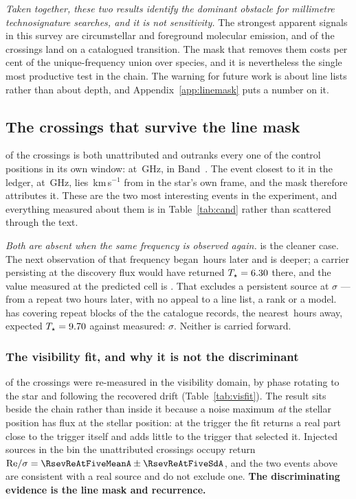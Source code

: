 \emph{Taken together, these two results identify the dominant obstacle for
millimetre technosignature searches, and it is not sensitivity.} The
strongest apparent signals in this survey are circumstellar and foreground
molecular emission, and \NAttributed{} of the \NCross{} crossings land on a
catalogued transition. The mask that removes them costs \FrMaskPct{} per
cent of the unique-frequency union over \FrNSpec{} species, and it is
nevertheless the single most productive test in the chain. The warning for
future work is about line lists rather than about depth, and
Appendix~\ref{app:linemask} puts a number on it.

\subsection{The crossings that survive the line mask}
\label{sec:chaingap}

\NUnattrRankFlagged{} of the \NCross{} crossings is both unattributed and
outranks every one of the \NCtrl{} control positions in its own window:
\RcSxStar{} at \RcSxFreq\,GHz, in Band~\RcSxBand. The event closest to it in
the ledger, \RcCpStar{} at \RcCpFreq\,GHz, lies \RcCpDv\,km\,s$^{-1}$ from
\RcCpLine{} in the star's own frame, and the mask therefore attributes it.
These are the two most interesting events in the experiment, and everything
measured about them is in Table~\ref{tab:cand} rather than scattered through
the text.

\emph{Both are absent when the same frequency is observed again.}
\RcCpStar{} is the cleaner case. The next observation of that frequency began
\RcCpNearH\,hours later and is deeper; a carrier persisting at the discovery
flux would have returned $T_\star=6.30$ there, and the value measured at
the predicted cell is \RcCpTObs. That excludes a persistent source at
\RcCpExcl$\sigma$ --- from a repeat two hours later, with no appeal to a line
list, a rank or a model. \RcSxStar{} has \RcSxNRep{} covering repeat blocks of
the \RcSxNCat{} the catalogue records, the nearest \RcSxNearH\,hours away,
expected $T_\star=9.70$ against \RcSxTObs{} measured: \RcSxExcl$\sigma$.
Neither is carried forward.

\subsubsection{The visibility fit, and why it is not the discriminant}
\label{sec:vistest}

\LgNFit{} of the \NCross{} crossings were re-measured in the visibility
domain, by phase rotating to the star and following the recovered drift
(Table~\ref{tab:visfit}). The result sits beside the chain rather than inside
it because a noise maximum \emph{at} the stellar position has flux at the
stellar position: at the trigger the fit returns a real part close to the
trigger itself and adds little to the trigger that selected it. Injected
sources in the bin the unattributed crossings occupy return
${\rm Re}/\sigma=\RsevReAtFiveMeanA\pm\RsevReAtFiveSdA$, and the two events
above are consistent with a real source and do not exclude one.
\textbf{The discriminating evidence is the line mask and recurrence.}

